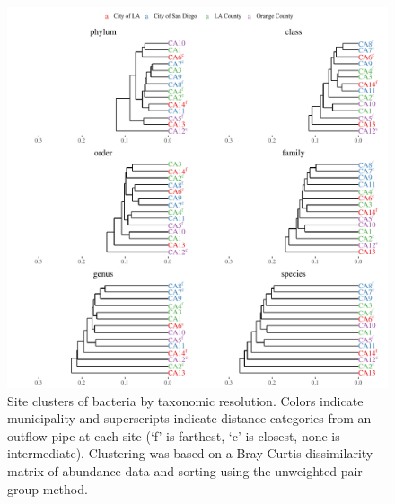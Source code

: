 \documentclass[letterpaper,12pt]{article}\usepackage[]{graphicx}\usepackage[]{color}
\newenvironment{knitrout}{}{} %
\begin{document}
\begin{knitrout}
\color{fgcolor}\begin{figure}[!ht]

{\centering \includegraphics[width=\textwidth]{figs/clust1_bac-1} 

}

\caption[Site clusters of bacteria by taxonomic resolution]{Site clusters of bacteria by taxonomic resolution.  Colors indicate municipality and superscripts indicate distance categories from an outflow pipe at each site (`f' is farthest, `c' is closest, none is intermediate).  Clustering was based on a Bray-Curtis dissimilarity matrix of abundance data and sorting using the unweighted pair group method.}\label{fig:clust1_bac}
\end{figure}


\end{knitrout}
\end{document}
